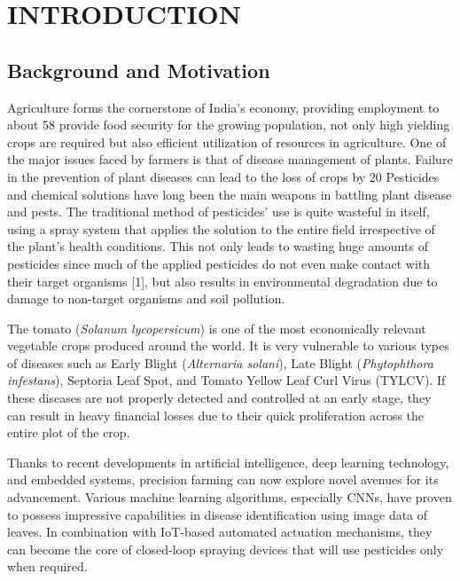 \documentclass[12pt,a4paper,oneside]{report}
\begin{document}
\chapter{INTRODUCTION}

\section{Background and Motivation}

Agriculture forms the cornerstone of India's economy, providing employment to about
58%
provide food security for the growing population, not only high yielding crops are required but
also efficient utilization of resources in agriculture. One of the major issues faced by farmers is
that of disease management of plants. Failure in the prevention of plant diseases can lead to
the loss of crops by 20%
Pesticides and chemical solutions have long been the main weapons in battling plant disease and
pests. The traditional method of pesticides' use is quite wasteful in itself, using a spray system
that applies the solution to the entire field irrespective of the plant's health conditions. This not
only leads to wasting huge amounts of pesticides since much of the applied pesticides do not
even make contact with their target organisms [1], but also results in environmental degradation
due to damage to non-target organisms and soil pollution.

The tomato (\textit{Solanum lycopersicum}) is one of the most economically relevant vegetable crops produced around the world. It is very vulnerable to various types of diseases such as Early Blight (\textit{Alternaria solani}), Late Blight (\textit{Phytophthora infestans}), Septoria Leaf Spot, and Tomato Yellow Leaf Curl Virus (TYLCV). If these diseases are not properly detected and controlled at an early stage, they can result in heavy financial losses due to their quick proliferation across the entire plot of the crop.

Thanks to recent developments in artificial intelligence, deep learning technology, and embedded systems, precision farming can now explore novel avenues for its advancement. Various machine learning algorithms, especially CNNs, have proven to possess impressive capabilities in disease identification using image data of leaves. In combination with IoT-based automated actuation mechanisms, they can become the core of closed-loop spraying devices that will use pesticides only when required.
\end{document}
